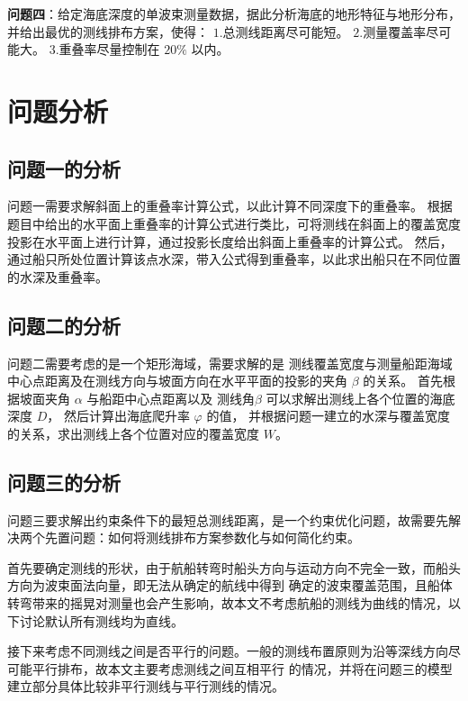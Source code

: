 \documentclass[withoutpreface,bwprint]{cumcmthesis} %
\begin{document}
        \textbf{问题四}：给定海底深度的单波束测量数据，据此分析海底的地形特征与地形分布，并给出最优的测线排布方案，使得：
        $1$.总测线距离尽可能短。
        $2$.测量覆盖率尽可能大。
        $3$.重叠率尽量控制在 $20\%$ 以内。

        \section{问题分析}
        \subsection{问题一的分析}
        问题一需要求解斜面上的重叠率计算公式，以此计算不同深度下的重叠率。
        根据题目中给出的水平面上重叠率的计算公式进行类比，可将测线在斜面上的覆盖宽度投影在水平面上进行计算，通过投影长度给出斜面上重叠率的计算公式。
        然后，通过船只所处位置计算该点水深，带入公式得到重叠率，以此求出船只在不同位置的水深及重叠率。
        
        
        
        \subsection{问题二的分析}
        问题二需要考虑的是一个矩形海域，需要求解的是
        测线覆盖宽度与测量船距海域中心点距离及在测线方向与坡面方向在水平平面的投影的夹角 $\beta$ 的关系。
        首先根据坡面夹角 $\alpha$ 与船距中心点距离以及 测线角$\beta$ 可以求解出测线上各个位置的海底深度 $D$，
        然后计算出海底爬升率 $\varphi$ 的值，
        并根据问题一建立的水深与覆盖宽度的关系，求出测线上各个位置对应的覆盖宽度 $W$。
        \subsection{问题三的分析}
        问题三要求解出约束条件下的最短总测线距离，是一个约束优化问题，故需要先解决两个先置问题：如何将测线排布方案参数化与如何简化约束。
        
        首先要确定测线的形状，由于航船转弯时船头方向与运动方向不完全一致\cite{bib_1}，而船头方向为波束面法向量，即无法从确定的航线中得到
        确定的波束覆盖范围，且船体转弯带来的摇晃对测量也会产生影响，故本文不考虑航船的测线为曲线的情况，以下讨论默认所有测线均为直线。

        接下来考虑不同测线之间是否平行的问题。一般的测线布置原则为沿等深线方向尽可能平行排布\cite{bib_2}，故本文主要考虑测线之间互相平行
        的情况，并将在问题三的模型建立部分具体比较非平行测线与平行测线的情况。
\end{document}
